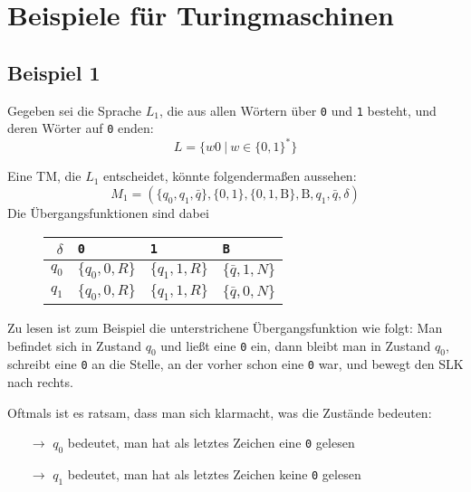 \documentclass{scrartcl}%
\begin{document}

    \section*{Beispiele für Turingmaschinen}
    \subsection*{Beispiel 1}
    Gegeben sei die Sprache $L_1$, die aus allen Wörtern über \texttt{0} und \texttt{1} besteht,
    und deren Wörter auf \texttt{0} enden:
    \begin{equation*}
        L = \{w0 \ | \ w \in \{0,1\}^* \}
    \end{equation*}

    Eine TM, die $L_1$ entscheidet, könnte folgendermaßen aussehen:
    \begin{equation*}
        M_1 = (\{q_0, q_1,\bar{q} \},\{0,1\},\{0,1,\text{B}\}, \text{B}, q_1, \bar{q}, \delta)
    \end{equation*}
    Die Übergangsfunktionen sind dabei

    \begin{figure}[htb]
        \centering
        \begin{tabular}{r|l|l|l}
            \textbf{\textsf{$\delta$}} & \texttt{0} & \texttt{1} & \texttt{B} \\
            \hline
            $q_0$ & \underline{$\{q_0, 0, R\}$} & $\{q_1, 1, R\}$ & $\{\bar{q}, 1, N \}$ \\
            $q_1$ & $\{q_0, 0, R\}$ & $\{q_1, 1, R\}$ & $\{\bar{q}, 0, N \}$ \\
            \hline
        \end{tabular}
    \end{figure}

    Zu lesen ist zum Beispiel die unterstrichene Übergangsfunktion wie folgt:
    Man befindet sich in Zustand $q_0$ und ließt eine \texttt{0} ein,
    dann bleibt man in Zustand $q_0$, schreibt eine \texttt{0} an die Stelle,
    an der vorher schon eine \texttt{0} war, und bewegt den SLK nach rechts.

    \vspace*{0.3cm}
    Oftmals ist es ratsam, dass man sich klarmacht, was die Zustände bedeuten:
    \begin{itemize}
        \item [$\rightarrow$] $q_0$ bedeutet, man hat als letztes Zeichen eine \texttt{0} gelesen
        \item [$\rightarrow$] $q_1$ bedeutet, man hat als letztes Zeichen keine \texttt{0} gelesen
    \end{itemize}
\end{document}
